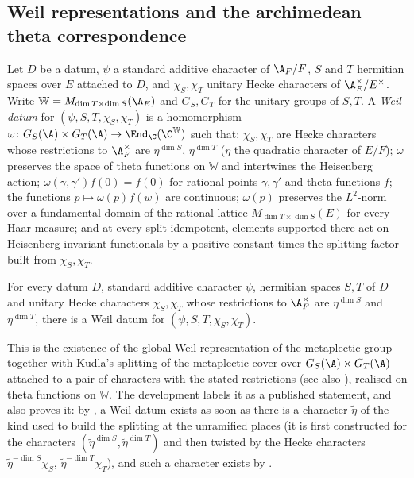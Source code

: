 \subsection{Weil representations and the archimedean theta correspondence}\label{sec:pf:sh-siegel:theta}

\begin{definition}\label{pf:sh-siegel:weildatum}
Let $D$ be a datum, $\psi$ a standard additive character of $\A_F/F$, $S$ and $T$ hermitian
spaces over $E$ attached to $D$, and $\chi_S,\chi_T$ unitary Hecke characters of $\A_E^\times/E^\times$. Write
$\mathbb W=M_{\dim T\times\dim S}(\A_E)$ and $G_S,G_T$ for the unitary groups of $S,T$. A \emph{Weil datum} for
$(\psi,S,T,\chi_S,\chi_T)$ is a homomorphism $\omega\colon G_S(\A)\times G_T(\A)\to\End_\C(\C^{\mathbb W})$ such that:
$\chi_S,\chi_T$ are Hecke characters whose restrictions to $\A_F^\times$ are $\eta^{\dim S}$, $\eta^{\dim T}$ ($\eta$ the
quadratic character of $E/F$); $\omega$ preserves the space of theta functions on $\mathbb W$ and intertwines the
Heisenberg action; $\omega(\gamma,\gamma')f(0)=f(0)$ for rational points $\gamma,\gamma'$ and theta functions $f$; the
functions $p\mapsto\omega(p)f(w)$ are continuous; $\omega(p)$ preserves the $L^2$-norm over a fundamental domain of the
rational lattice $M_{\dim T\times\dim S}(E)$ for every Haar measure; and at every split idempotent, elements supported
there act on Heisenberg-invariant functionals by a positive constant times the splitting factor built from
$\chi_S,\chi_T$.
\end{definition}

\begin{littheorem}
\label{pf:sh-siegel:weil}
For every datum $D$, standard additive character $\psi$, hermitian spaces $S,T$ of $D$ and unitary Hecke characters
$\chi_S,\chi_T$ whose restrictions to $\A_F^\times$ are $\eta^{\dim S}$ and $\eta^{\dim T}$, there is a Weil datum for
$(\psi,S,T,\chi_S,\chi_T)$.
\end{littheorem}

This is the existence of the global Weil representation of the metaplectic group \cite{Weil1964} together with Kudla's
splitting of the metaplectic cover over $G_S(\A)\times G_T(\A)$ attached to a pair of characters with the stated
restrictions \cite{Kudla1994} (see also \cite[\S1]{HarrisKudlaSweet1996}), realised on theta functions on $\mathbb W$.
The development labels it as a published statement, and also proves it: by
, a Weil datum exists as soon as there is a character
$\tilde\eta$ of the kind used to build the splitting at the unramified places (it is first constructed for the
characters $(\tilde\eta^{\dim S},\tilde\eta^{\dim T})$ and then twisted by the Hecke characters
$\tilde\eta^{-\dim S}\chi_S$, $\tilde\eta^{-\dim T}\chi_T$), and such a character exists by
.

